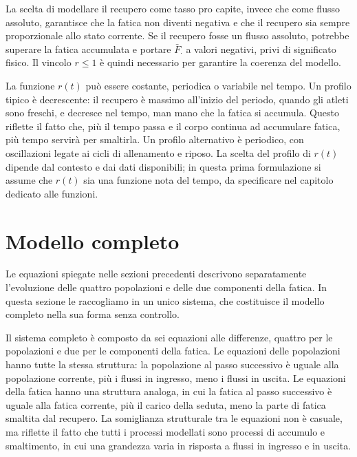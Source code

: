 La scelta di modellare il recupero come tasso pro capite, invece che come flusso assoluto, garantisce che la fatica non diventi negativa e che il recupero sia sempre proporzionale allo stato corrente. Se il recupero fosse un flusso assoluto, potrebbe superare la fatica accumulata e portare $\bar{F}_\cdot$ a valori negativi, privi di significato fisico. Il vincolo $r \leq 1$ è quindi necessario per garantire la coerenza del modello. \par

La funzione $r(t)$ può essere costante, periodica o variabile nel tempo. Un profilo tipico è decrescente: il recupero è massimo all'inizio del periodo, quando gli atleti sono freschi, e decresce nel tempo, man mano che la fatica si accumula. Questo riflette il fatto che, più il tempo passa e il corpo continua ad accumulare fatica, più tempo servirà per smaltirla. Un profilo alternativo è periodico, con oscillazioni legate ai cicli di allenamento e riposo. La scelta del profilo di $r(t)$ dipende dal contesto e dai dati disponibili; in questa prima formulazione si assume che $r(t)$ sia una funzione nota del tempo, da specificare nel capitolo dedicato alle funzioni.

\section{Modello completo}\label{sec:model-complete}

Le equazioni spiegate nelle sezioni precedenti descrivono separatamente l'evoluzione delle quattro popolazioni e delle due componenti della fatica. In questa sezione le raccogliamo in un unico sistema, che costituisce il modello completo nella sua forma senza controllo. \par

Il sistema completo è composto da sei equazioni alle differenze, quattro per le popolazioni e due per le componenti della fatica. Le equazioni delle popolazioni hanno tutte la stessa struttura: la popolazione al passo successivo è uguale alla popolazione corrente, più i flussi in ingresso, meno i flussi in uscita. Le equazioni della fatica hanno una struttura analoga, in cui la fatica al passo successivo è uguale alla fatica corrente, più il carico della seduta, meno la parte di fatica smaltita dal recupero. La somiglianza strutturale tra le equazioni non è casuale, ma riflette il fatto che tutti i processi modellati sono processi di accumulo e smaltimento, in cui una grandezza varia in risposta a flussi in ingresso e in uscita. \par

